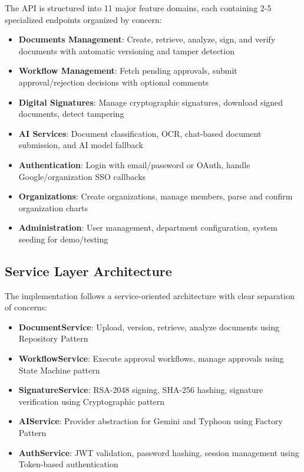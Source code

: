\documentclass[12pt,oneside,openright,a4paper]{cpe-english-project}
\begin{document}
The API is structured into 11 major feature domains, each containing 2-5 specialized endpoints organized by concern:

\begin{itemize}
    \item \textbf{Documents Management}: Create, retrieve, analyze, sign, and verify documents with automatic versioning and tamper detection
    \item \textbf{Workflow Management}: Fetch pending approvals, submit approval/rejection decisions with optional comments
    \item \textbf{Digital Signatures}: Manage cryptographic signatures, download signed documents, detect tampering
    \item \textbf{AI Services}: Document classification, OCR, chat-based document submission, and AI model fallback
    \item \textbf{Authentication}: Login with email/password or OAuth, handle Google/organization SSO callbacks
    \item \textbf{Organizations}: Create organizations, manage members, parse and confirm organization charts
    \item \textbf{Administration}: User management, department configuration, system seeding for demo/testing
\end{itemize}

\subsection{Service Layer Architecture}

The implementation follows a service-oriented architecture with clear separation of concerns:

\begin{itemize}
    \item \textbf{DocumentService}: Upload, version, retrieve, analyze documents using Repository Pattern
    \item \textbf{WorkflowService}: Execute approval workflows, manage approvals using State Machine pattern
    \item \textbf{SignatureService}: RSA-2048 signing, SHA-256 hashing, signature verification using Cryptographic pattern
    \item \textbf{AIService}: Provider abstraction for Gemini and Typhoon using Factory Pattern
    \item \textbf{AuthService}: JWT validation, password hashing, session management using Token-based authentication
\end{itemize}
\end{document}
